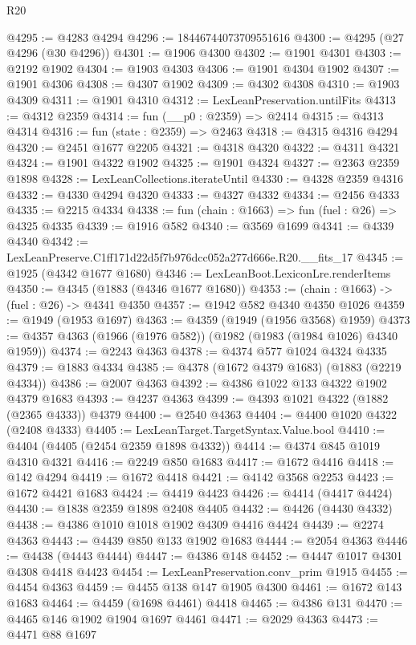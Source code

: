 \begin{lexlean}{R20}
\begin{coremodule}
@4295 := @4283 @4294
@4296 := 18446744073709551616
@4300 := @4295 (@27 @4296 (@30 @4296))
@4301 := @1906 @4300
@4302 := @1901 @4301
@4303 := @2192 @1902
@4304 := @1903 @4303
@4306 := @1901 @4304 @1902
@4307 := @1901 @4306
@4308 := @4307 @1902
@4309 := @4302 @4308
@4310 := @1903 @4309
@4311 := @1901 @4310
@4312 := LexLeanPreservation.untilFits
@4313 := @4312 @2359
@4314 := fun (__p0 : @2359) => @2414
@4315 := @4313 @4314
@4316 := fun (state : @2359) => @2463
@4318 := @4315 @4316 @4294
@4320 := @2451 @1677 @2205
@4321 := @4318 @4320
@4322 := @4311 @4321
@4324 := @1901 @4322 @1902
@4325 := @1901 @4324
@4327 := @2363 @2359 @1898
@4328 := LexLeanCollections.iterateUntil
@4330 := @4328 @2359 @4316
@4332 := @4330 @4294 @4320
@4333 := @4327 @4332
@4334 := @2456 @4333
@4335 := @2215 @4334
@4338 := fun (chain : @1663) => fun (fuel : @26) => @4325 @4335
@4339 := @1916 @582
@4340 := @3569 @1699
@4341 := @4339 @4340
@4342 := LexLeanPreserve.C1ff171d22d5f7b976dcc052a277d666e.R20.__fits_17
@4345 := @1925 (@4342 @1677 @1680)
@4346 := LexLeanBoot.LexiconLre.renderItems
@4350 := @4345 (@1883 (@4346 @1677 @1680))
@4353 := (chain : @1663) -> (fuel : @26) -> @4341 @4350
@4357 := @1942 @582 @4340 @4350 @1026
@4359 := @1949 (@1953 @1697)
@4363 := @4359 (@1949 (@1956 @3568) @1959)
@4373 := @4357 @4363 (@1966 (@1976 @582)) (@1982 (@1983 (@1984 @1026) @4340 @1959))
@4374 := @2243 @4363
@4378 := @4374 @577 @1024 @4324 @4335
@4379 := @1883 @4334
@4385 := @4378 (@1672 @4379 @1683) (@1883 (@2219 @4334))
@4386 := @2007 @4363
@4392 := @4386 @1022 @133 @4322 @1902 @4379 @1683
@4393 := @4237 @4363
@4399 := @4393 @1021 @4322 (@1882 (@2365 @4333)) @4379
@4400 := @2540 @4363
@4404 := @4400 @1020 @4322 (@2408 @4333)
@4405 := LexLeanTarget.TargetSyntax.Value.bool
@4410 := @4404 (@4405 (@2454 @2359 @1898 @4332))
@4414 := @4374 @845 @1019 @4310 @4321
@4416 := @2249 @850 @1683
@4417 := @1672 @4416
@4418 := @142 @4294
@4419 := @1672 @4418
@4421 := @4142 @3568 @2253
@4423 := @1672 @4421 @1683
@4424 := @4419 @4423
@4426 := @4414 (@4417 @4424)
@4430 := @1838 @2359 @1898 @2408 @4405
@4432 := @4426 (@4430 @4332)
@4438 := @4386 @1010 @1018 @1902 @4309 @4416 @4424
@4439 := @2274 @4363
@4443 := @4439 @850 @133 @1902 @1683
@4444 := @2054 @4363
@4446 := @4438 (@4443 @4444)
@4447 := @4386 @148
@4452 := @4447 @1017 @4301 @4308 @4418 @4423
@4454 := LexLeanPreservation.conv_prim @1915
@4455 := @4454 @4363
@4459 := @4455 @138 @147 @1905 @4300
@4461 := @1672 @143 @1683
@4464 := @4459 (@1698 @4461) @4418
@4465 := @4386 @131
@4470 := @4465 @146 @1902 @1904 @1697 @4461
@4471 := @2029 @4363
@4473 := @4471 @88 @1697

\end{coremodule}
\end{lexlean}

